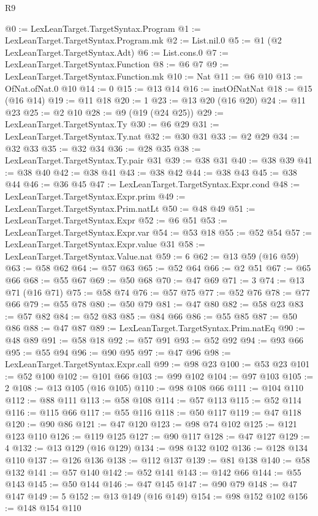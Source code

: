 \begin{lexlean}{R9}
\begin{coremodule}
@0 := LexLeanTarget.TargetSyntax.Program
@1 := LexLeanTarget.TargetSyntax.Program.mk
@2 := List.nil.{0}
@5 := @1 (@2 LexLeanTarget.TargetSyntax.Adt)
@6 := List.cons.{0}
@7 := LexLeanTarget.TargetSyntax.Function
@8 := @6 @7
@9 := LexLeanTarget.TargetSyntax.Function.mk
@10 := Nat
@11 := @6 @10
@13 := OfNat.ofNat.{0} @10
@14 := 0
@15 := @13 @14
@16 := instOfNatNat
@18 := @15 (@16 @14)
@19 := @11 @18
@20 := 1
@23 := @13 @20 (@16 @20)
@24 := @11 @23
@25 := @2 @10
@28 := @9 (@19 (@24 @25))
@29 := LexLeanTarget.TargetSyntax.Ty
@30 := @6 @29
@31 := LexLeanTarget.TargetSyntax.Ty.nat
@32 := @30 @31
@33 := @2 @29
@34 := @32 @33
@35 := @32 @34
@36 := @28 @35
@38 := LexLeanTarget.TargetSyntax.Ty.pair @31
@39 := @38 @31
@40 := @38 @39
@41 := @38 @40
@42 := @38 @41
@43 := @38 @42
@44 := @38 @43
@45 := @38 @44
@46 := @36 @45
@47 := LexLeanTarget.TargetSyntax.Expr.cond
@48 := LexLeanTarget.TargetSyntax.Expr.prim
@49 := LexLeanTarget.TargetSyntax.Prim.natLt
@50 := @48 @49
@51 := LexLeanTarget.TargetSyntax.Expr
@52 := @6 @51
@53 := LexLeanTarget.TargetSyntax.Expr.var
@54 := @53 @18
@55 := @52 @54
@57 := LexLeanTarget.TargetSyntax.Expr.value @31
@58 := LexLeanTarget.TargetSyntax.Value.nat
@59 := 6
@62 := @13 @59 (@16 @59)
@63 := @58 @62
@64 := @57 @63
@65 := @52 @64
@66 := @2 @51
@67 := @65 @66
@68 := @55 @67
@69 := @50 @68
@70 := @47 @69
@71 := 3
@74 := @13 @71 (@16 @71)
@75 := @58 @74
@76 := @57 @75
@77 := @52 @76
@78 := @77 @66
@79 := @55 @78
@80 := @50 @79
@81 := @47 @80
@82 := @58 @23
@83 := @57 @82
@84 := @52 @83
@85 := @84 @66
@86 := @55 @85
@87 := @50 @86
@88 := @47 @87
@89 := LexLeanTarget.TargetSyntax.Prim.natEq
@90 := @48 @89
@91 := @58 @18
@92 := @57 @91
@93 := @52 @92
@94 := @93 @66
@95 := @55 @94
@96 := @90 @95
@97 := @47 @96
@98 := LexLeanTarget.TargetSyntax.Expr.call
@99 := @98 @23
@100 := @53 @23
@101 := @52 @100
@102 := @101 @66
@103 := @99 @102
@104 := @97 @103
@105 := 2
@108 := @13 @105 (@16 @105)
@110 := @98 @108 @66
@111 := @104 @110
@112 := @88 @111
@113 := @58 @108
@114 := @57 @113
@115 := @52 @114
@116 := @115 @66
@117 := @55 @116
@118 := @50 @117
@119 := @47 @118
@120 := @90 @86
@121 := @47 @120
@123 := @98 @74 @102
@125 := @121 @123 @110
@126 := @119 @125
@127 := @90 @117
@128 := @47 @127
@129 := 4
@132 := @13 @129 (@16 @129)
@134 := @98 @132 @102
@136 := @128 @134 @110
@137 := @126 @136
@138 := @112 @137
@139 := @81 @138
@140 := @58 @132
@141 := @57 @140
@142 := @52 @141
@143 := @142 @66
@144 := @55 @143
@145 := @50 @144
@146 := @47 @145
@147 := @90 @79
@148 := @47 @147
@149 := 5
@152 := @13 @149 (@16 @149)
@154 := @98 @152 @102
@156 := @148 @154 @110

\end{coremodule}
\end{lexlean}
